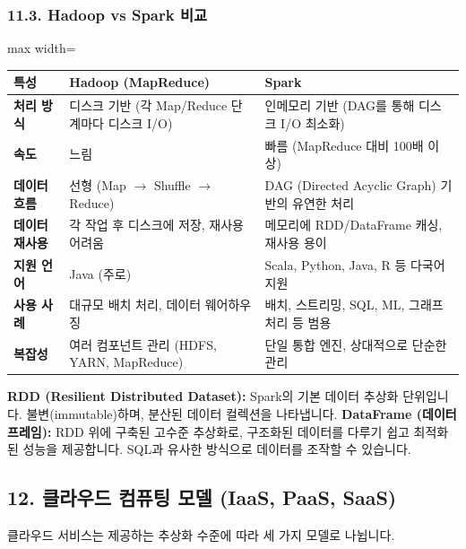 \documentclass[11pt,a4paper]{article}
\begin{document}
\subsubsection*{11.3. Hadoop vs Spark 비교}

\begin{adjustbox}{max width=\textwidth}
\begin{tabular}{lll}
\toprule
\textbf{특성} & \textbf{Hadoop (MapReduce)} & \textbf{Spark} \\
\midrule
\textbf{처리 방식} & 디스크 기반 (각 Map/Reduce 단계마다 디스크 I/O) & 인메모리 기반 (DAG를 통해 디스크 I/O 최소화) \\
\textbf{속도} & 느림 & 빠름 (MapReduce 대비 100배 이상) \\
\textbf{데이터 흐름} & 선형 (Map $\rightarrow$ Shuffle $\rightarrow$ Reduce) & DAG (Directed Acyclic Graph) 기반의 유연한 처리 \\
\textbf{데이터 재사용} & 각 작업 후 디스크에 저장, 재사용 어려움 & 메모리에 RDD/DataFrame 캐싱, 재사용 용이 \\
\textbf{지원 언어} & Java (주로) & Scala, Python, Java, R 등 다국어 지원 \\
\textbf{사용 사례} & 대규모 배치 처리, 데이터 웨어하우징 & 배치, 스트리밍, SQL, ML, 그래프 처리 등 범용 \\
\textbf{복잡성} & 여러 컴포넌트 관리 (HDFS, YARN, MapReduce) & 단일 통합 엔진, 상대적으로 단순한 관리 \\
\bottomrule
\end{tabular}
\end{adjustbox}

\begin{notebox}
\textbf{RDD (Resilient Distributed Dataset):} Spark의 기본 데이터 추상화 단위입니다. 불변(immutable)하며, 분산된 데이터 컬렉션을 나타냅니다.
\textbf{DataFrame (데이터프레임):} RDD 위에 구축된 고수준 추상화로, 구조화된 데이터를 다루기 쉽고 최적화된 성능을 제공합니다. SQL과 유사한 방식으로 데이터를 조작할 수 있습니다.
\end{notebox}

\subsection*{12. 클라우드 컴퓨팅 모델 (IaaS, PaaS, SaaS)}

클라우드 서비스는 제공하는 추상화 수준에 따라 세 가지 모델로 나뉩니다.
\end{document}
